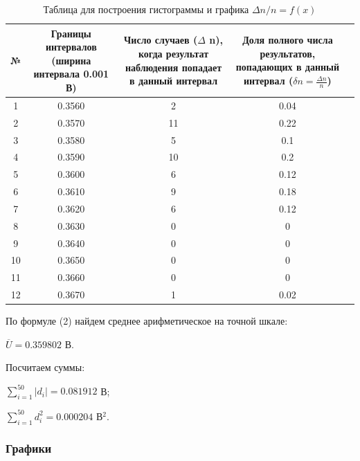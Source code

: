 \begin{center}
\begin{table}[h!]
\centering
\caption{Таблица для построения гистограммы и графика $\Delta n/n = f(x)$
}
\label{tabl:4}
\begin{tabular}{|c|c|c|c|c|}
\hline
\begin{minipage}{7mm}
    №
\end{minipage}&
\begin{minipage}{5cm}
    Границы интервалов (ширина интервала 0.001 В)
\end{minipage} &
\begin{minipage}{5cm}
    Число случаев ($\Delta$ n), когда результат наблюдения попадает в данный интервал
\end{minipage} &
\begin{minipage}{5cm}
    Доля полного числа результатов, попадающих в данный интервал ($\delta n = \frac{\Delta n}{n}$)
\end{minipage}\\
\hline
1 &	0.3560  &	2 & 0.04 \\
2 &	0.3570  &	11 & 0.22 \\
3 &	0.3580  &	5 & 0.1 \\
4 &	0.3590  &	10 & 0.2 \\
5 & 0.3600  &	6 & 0.12 \\
6 & 0.3610  &	9 & 0.18 \\
7 & 0.3620  &	6 & 0.12 \\
8 & 0.3630  &	0 & 0 \\
9 & 0.3640  &	0 & 0 \\
10& 0.3650  &	0 & 0 \\
11& 0.3660  &	0 & 0 \\
12& 0.3670  &	1 & 0.02 \\
\hline
\end{tabular}
\end{table}
\end{center}

По формуле (2) найдем среднее арифметическое на точной шкале:

$\overline{U} = 0.359802$ В.

Посчитаем суммы:

$\sum_{i=1}^{50} |d_i| = 0.081912$ В;

$\sum_{i=1}^{50} d_i^2 = 0.000204$ В$^2$.

\subsubsection{Графики}

